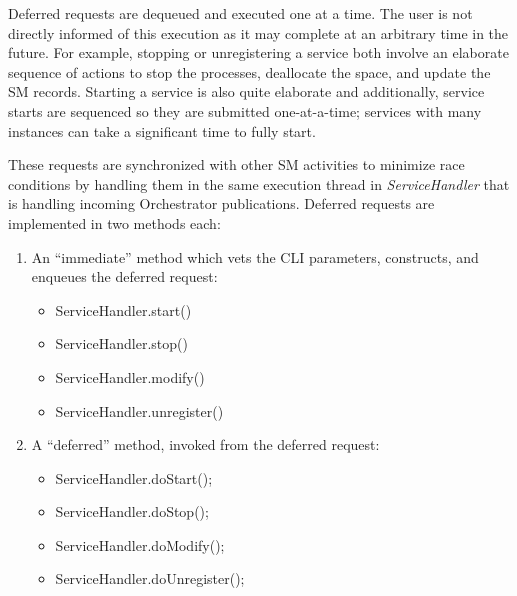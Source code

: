     Deferred requests are dequeued and executed one at a time.  The user is not directly
    informed of this execution as it may complete at an arbitrary time in the future.  For
    example, stopping or unregistering a service both involve an elaborate sequence of
    actions to stop the processes, deallocate the space, and update the SM records.
    Starting a service is also quite elaborate and additionally, service starts are
    sequenced so they are submitted one-at-a-time; services with many instances can take
    a significant time to fully start.

    These requests are synchronized with other SM activities to minimize race conditions by
    handling them in the same execution thread in {\em ServiceHandler} that is handling incoming Orchestrator
    publications.  Deferred requests are implemented in two methods each:
    \begin{enumerate}
      \item An ``immediate'' method which vets the CLI parameters, constructs, and enqueues the deferred request:
        \begin{itemize}
          \item ServiceHandler.start()
          \item ServiceHandler.stop()  
          \item ServiceHandler.modify()
          \item ServiceHandler.unregister() 
          \end{itemize}                      
      \item A ``deferred'' method, invoked from the deferred request:
        \begin{itemize}
          \item ServiceHandler.doStart();
          \item ServiceHandler.doStop();
          \item ServiceHandler.doModify();
          \item ServiceHandler.doUnregister();
        \end{itemize}
        
    \end{enumerate}
    
